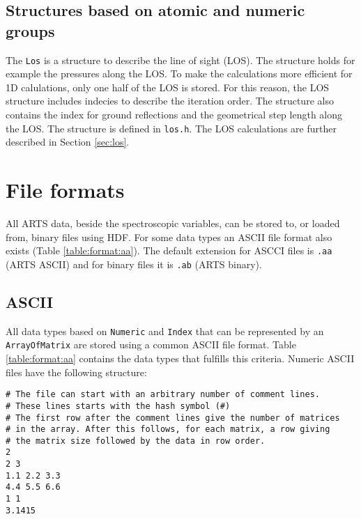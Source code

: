 \subsection{Structures based on atomic and numeric groups}

The \verb|Los| is a structure to describe the line of sight (LOS).
The structure holds for example the pressures along the LOS. To make the
calculations more efficient for 1D calulations, only one half of the
LOS is stored.  For this reason, the LOS structure includes indecies
to describe the iteration order. The structure also contains the
index for ground reflections and the geometrical step length along
the LOS. The structure is defined in \verb|los.h|.
The LOS calculations are further described in Section \ref{sec:los}.



\section{File formats}
 \label{sec:formats:files}
 
 All ARTS data, beside the spectroscopic variables, can be stored to,
 or loaded from, binary files using HDF.  For some data types an ASCII
 file format also exists (Table \ref{table:format:aa}). The default
 extension for ASCCI files is \verb|.aa| (ARTS ASCII) and for binary
 files it is \verb|.ab| (ARTS binary).
 
 \subsection{ASCII}
  \label{sec:formats:file:ascii}
  
  All data types based on \verb|Numeric| and \verb|Index| that can be
  represented by an \verb|ArrayOfMatrix| are stored using a common ASCII
  file format. Table \ref{table:format:aa} contains the data types that
  fulfills this criteria. Numeric ASCII files have the following 
  structure: \\
  {\footnotesize \begin{verbatim} 
# The file can start with an arbitrary number of comment lines.  
# These lines starts with the hash symbol (#) 
# The first row after the comment lines give the number of matrices 
# in the array. After this follows, for each matrix, a row giving 
# the matrix size followed by the data in row order.  
2 
2 3 
1.1 2.2 3.3 
4.4 5.5 6.6 
1 1 
3.1415
 \end{verbatim} 
}

